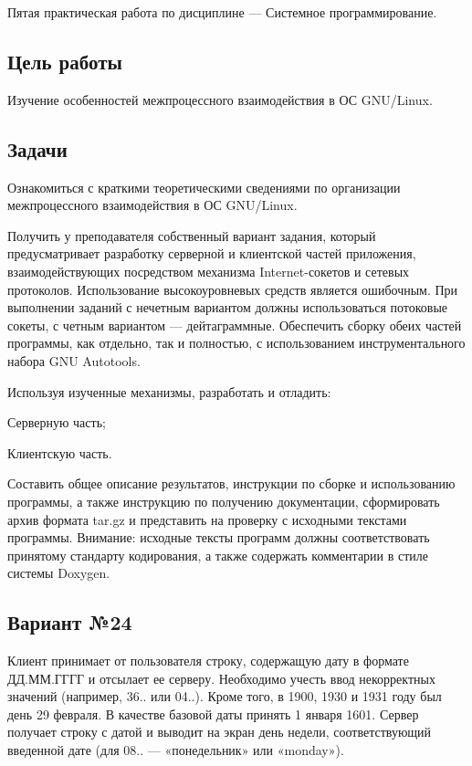 Пятая практическая работа по дисциплине — Системное программирование.

\subsection*{Цель работы}

Изучение особенностей межпроцессного взаимодействия в ОС G\+N\+U/\+Linux.

\subsection*{Задачи}


\begin{DoxyEnumerate}
\item Ознакомиться с краткими теоретическими сведениями по организации межпроцессного взаимодействия в ОС G\+N\+U/\+Linux.
\item Получить у преподавателя собственный вариант задания, который предусматривает разработку серверной и клиентской частей приложения, взаимодействующих посредством механизма Internet-\/сокетов и сетевых протоколов. Использование высокоуровневых средств является ошибочным. При выполнении заданий с нечетным вариантом должны использоваться потоковые сокеты, с четным вариантом — дейтаграммные. Обеспечить сборку обеих частей программы, как отдельно, так и полностью, с использованием инструментального набора G\+NU Autotools.
\item Используя изученные механизмы, разработать и отладить\+:
\end{DoxyEnumerate}
\begin{DoxyItemize}
\item Серверную часть;
\item Клиентскую часть.
\end{DoxyItemize}
\begin{DoxyEnumerate}
\item Составить общее описание результатов, инструкции по сборке и использованию программы, а также инструкцию по получению документации, сформировать архив формата tar.\+gz и представить на проверку с исходными текстами программы. Внимание\+: исходные тексты программ должны соответствовать принятому стандарту кодирования, а также содержать комментарии в стиле системы Doxygen.
\end{DoxyEnumerate}

\subsection*{Вариант №24}

Клиент принимает от пользователя строку, содержащую дату в формате ДД.\+ММ.\+ГГГГ и отсылает ее серверу. Необходимо учесть ввод некорректных значений (например, 36.. или 04..). Кроме того, в 1900, 1930 и 1931 году был день 29 февраля. В качестве базовой даты принять 1 января 1601. Сервер получает строку с датой и выводит на экран день недели, соответствующий введенной дате (для 08.. — «понедельник» или «monday»). 